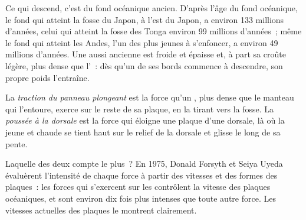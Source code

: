 Ce qui descend, c'est du fond océanique ancien. D'après l'âge du fond
océanique, le fond qui atteint la fosse du Japon, à l'est du Japon, a
environ 133 millions d'années, celui qui atteint la fosse des Tonga environ
99 millions d'années~; même le fond qui atteint les Andes, l'un des plus
jeunes à s'enfoncer, a environ 49 millions d'années. Une  aussi
ancienne est froide et épaisse et, à part sa croûte légère, plus dense que
l'~: dès qu'un de ses bords commence à descendre, son propre
poids l'entraîne.

\begin{definition}\label{def:g11:subduction-zones:slab-pull}
La \emph{traction du panneau plongeant}
est la force qu'un , plus dense que le manteau qui
l'entoure, exerce sur le reste de sa plaque, en la tirant vers la fosse. La
\emph{poussée à la dorsale}
est la force qui éloigne une plaque d'une dorsale, là où la
 jeune et chaude se tient haut sur le relief de la dorsale et
glisse le long de sa pente.
\end{definition}

Laquelle des deux compte le plus~? En 1975, Donald Forsyth et Seiya Uyeda
évaluèrent l'intensité de chaque force à partir des vitesses et des formes
des plaques~: les forces qui s'exercent sur les 
contrôlent la vitesse des plaques océaniques, et sont environ dix fois plus
intenses que toute autre force. Les vitesses actuelles des plaques le
montrent clairement.

